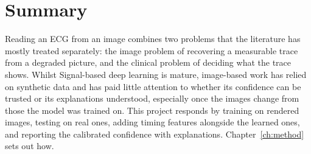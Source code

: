 \section{Summary}
\label{sec:lit-summary}

Reading an ECG from an image combines two problems that the literature has mostly treated
separately: the image problem of recovering a measurable trace from a degraded picture, and the
clinical problem of deciding what the trace shows. Whilst Signal-based deep learning is mature,
image-based work has relied on synthetic data and has paid little attention to whether its
confidence can be trusted or its explanations understood, especially once the images change
from those the model was trained on. This project responds by training on rendered images,
testing on real ones, adding timing features alongside the learned ones, and reporting the calibrated confidence with explanations. Chapter~\ref{ch:method} sets out how.